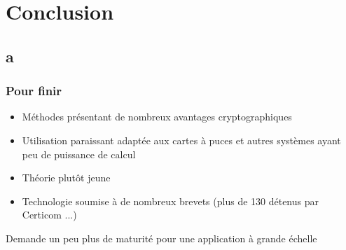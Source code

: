 \documentclass[9pt]{beamer}
\begin{document}
\section{Conclusion}

\subsection*{a}

\begin{frame}
    \frametitle{Pour finir}
    \vfill
    \begin{itemize}
        \item Méthodes présentant de nombreux avantages cryptographiques
            \vfill
        \item Utilisation paraissant adaptée aux cartes à puces et autres systèmes ayant peu de
            puissance de calcul 
            \vfill
        \item Théorie plutôt jeune
            \vfill
        \item Technologie soumise à de nombreux brevets (plus de 130 détenus par Certicom ...)
    \end{itemize}
    \vfill
    Demande un peu plus de maturité pour une application à grande échelle
    \vfill
\end{frame}
\end{document}
